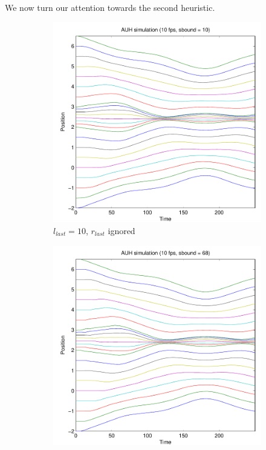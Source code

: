 \documentclass[11pt]{article}
\begin{document}
We now turn our attention towards the second heuristic.

\begin{figure}[H]
    \begin{subfigure}[t]{0.5\textwidth}
        \includegraphics[width=\textwidth]{../images/atomic_multiscale_10fps_10sbound.pdf}
        \caption{$l_{last} = 10$, $r_{last}$ ignored}
        \label{fig:atomic_multi_10sbound}
    \end{subfigure}
    \begin{subfigure}[t]{0.5\textwidth}
        \includegraphics[width=\textwidth]{../images/atomic_multiscale_10fps_68sbound.pdf}

\end{subfigure}
\end{figure}
\end{document}

